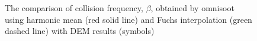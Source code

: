 \begin{figure}[H]
	\centering
	\caption{The comparison of collision frequency, $\beta$, obtained by omnisoot using harmonic mean (red solid line) and Fuchs interpolation (green dashed line) with DEM results (symbols)~\citep{goudeli2015coagulation}}
	\label{fig:kernelvalid} 
\end{figure}





